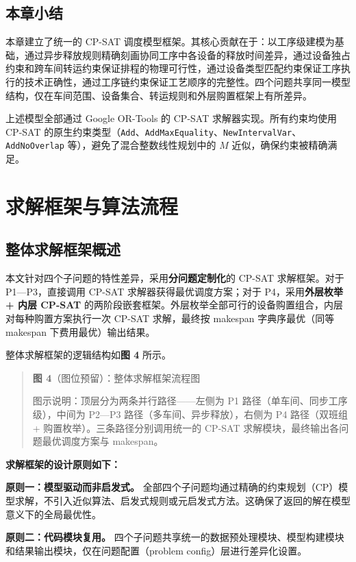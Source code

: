 \documentclass[UTF8,a4paper,12pt]{ctexart}
\begin{document}
\subsection{本章小结}
本章建立了统一的 CP-SAT 调度模型框架。其核心贡献在于：以工序级建模为基础，通过异步释放规则精确刻画协同工序中各设备的释放时间差异，通过设备独占约束和跨车间转运约束保证排程的物理可行性，通过设备类型匹配约束保证工序执行的技术正确性，通过工序链约束保证工艺顺序的完整性。四个问题共享同一模型结构，仅在车间范围、设备集合、转运规则和外层购置框架上有所差异。

上述模型全部通过 Google OR-Tools 的 CP-SAT 求解器实现。所有约束均使用 CP-SAT 的原生约束类型（\texttt{Add}、\texttt{AddMaxEquality}、\texttt{NewIntervalVar}、\texttt{AddNoOverlap} 等），避免了混合整数线性规划中的 $M$ 近似，确保约束被精确满足。


\section{求解框架与算法流程}

\subsection{整体求解框架概述}
本文针对四个子问题的特性差异，采用\textbf{分问题定制化}的 CP-SAT 求解框架。对于 P1—P3，直接调用 CP-SAT 求解器获得最优调度方案；对于 P4，采用\textbf{外层枚举 + 内层 CP-SAT} 的两阶段嵌套框架。外层枚举全部可行的设备购置组合，内层对每种购置方案执行一次 CP-SAT 求解，最终按 makespan 字典序最优（同等 makespan 下费用最优）输出结果。

整体求解框架的逻辑结构如\textbf{图 4} 所示。

\begin{quote}
\textbf{图 4}（图位预留）：整体求解框架流程图

图示说明：顶层分为两条并行路径——左侧为 P1 路径（单车间、同步工序级），中间为 P2—P3 路径（多车间、异步释放），右侧为 P4 路径（双班组 + 购置枚举）。三条路径分别调用统一的 CP-SAT 求解模块，最终输出各问题最优调度方案与 makespan。
\end{quote}

\textbf{求解框架的设计原则如下：}

\textbf{原则一：模型驱动而非启发式。} 全部四个子问题均通过精确的约束规划（CP）模型求解，不引入近似算法、启发式规则或元启发式方法。这确保了返回的解在模型意义下的全局最优性。

\textbf{原则二：代码模块复用。} 四个子问题共享统一的数据预处理模块、模型构建模块和结果输出模块，仅在问题配置（problem config）层进行差异化设置。
\end{document}

